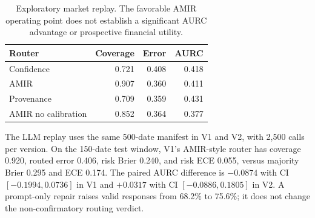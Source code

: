\documentclass[11pt]{article}
\begin{document}
\begin{table}[h]
\centering
\small
\begin{tabular}{lrrr}
\toprule
Router & Coverage & Error & AURC \\
\midrule
Confidence & 0.721 & 0.408 & 0.418 \\
AMIR & 0.907 & 0.360 & 0.411 \\
Provenance & 0.709 & 0.359 & 0.431 \\
AMIR no calibration & 0.852 & 0.364 & 0.377 \\
\bottomrule
\end{tabular}
\caption{Exploratory market replay. The favorable AMIR operating point does not establish a significant AURC advantage or prospective financial utility.}
\end{table}

The LLM replay uses the same 500-date manifest in V1 and V2, with 2,500 calls per version. On the 150-date test window, V1's AMIR-style router has coverage 0.920, routed error 0.406, risk Brier 0.240, and risk ECE 0.055, versus majority Brier 0.295 and ECE 0.174. The paired AURC difference is $-0.0874$ with CI $[-0.1994,0.0736]$ in V1 and $+0.0317$ with CI $[-0.0886,0.1805]$ in V2. A prompt-only repair raises valid responses from 68.2\% to 75.6\%; it does not change the non-confirmatory routing verdict.
\end{document}
